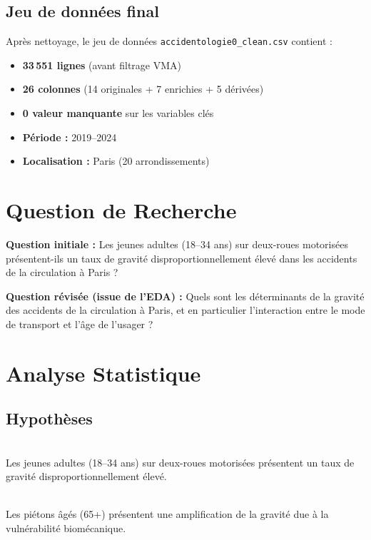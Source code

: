 \documentclass[12pt,a4paper]{article}
\begin{document}
\subsection{Jeu de données final}

Après nettoyage, le jeu de données \texttt{accidentologie0\_clean.csv}
contient :
\begin{itemize}
  \item \textbf{33\,551 lignes} (avant filtrage VMA)
  \item \textbf{26 colonnes} (14 originales + 7 enrichies + 5 dérivées)
  \item \textbf{0 valeur manquante} sur les variables clés
  \item \textbf{Période :} 2019--2024
  \item \textbf{Localisation :} Paris (20 arrondissements)
\end{itemize}


\section{Question de Recherche}

\textbf{Question initiale :} Les jeunes adultes (18--34 ans) sur deux-roues
motorisées présentent-ils un taux de gravité disproportionnellement élevé
dans les accidents de la circulation à Paris ?

\textbf{Question révisée (issue de l'EDA) :} Quels sont les déterminants
de la gravité des accidents de la circulation à Paris, et en particulier
l'interaction entre le mode de transport et l'âge de l'usager ?


\section{Analyse Statistique}

\subsection{Hypothèses}

\begin{description}[style=nextline]
  \item[H\textsubscript{0} (initiale) :]\hfill\\
        Les jeunes adultes (18--34 ans) sur deux-roues motorisées
        présentent un taux de gravité disproportionnellement élevé.

  \item[H\textsubscript{1} (révisée, data-driven) :]\hfill\\
        Les piétons âgés (65+) présentent une amplification de la gravité
        due à la vulnérabilité biomécanique.
\end{description}
\end{document}
